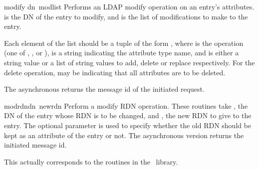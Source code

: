 
\begin{methoddesc}[int]{modify}{ dn\, modlist }
Performs an LDAP modify operation on an entry's attributes. 
 is the DN of the entry to modify,
and  is the list of modifications to make to the entry.

Each element of the list  should be a tuple of the form 
,
where  is the operation (one of , 
, or ),
 is a string indicating the attribute type name, and 
 is either a string value or a list of string values to add, 
delete or replace respectively.  For the delete operation, 
may be  indicating that all attributes are to be deleted.

The asynchronous  returns the message id of the 
initiated request.

\end{methoddesc}


\begin{methoddesc}[int]{modrdn}{dn\, newrdn }
Perform a modify RDN operation. These routines take , the DN
of the entry whose RDN is to be changed, and , the new RDN to
give to the entry. The optional parameter  is used to specify
whether the old RDN should be kept as an attribute of the entry or not.
The asynchronous version returns the initiated message id.

This actually corresponds to the  routines in the \C\ library.
\end{methoddesc}


